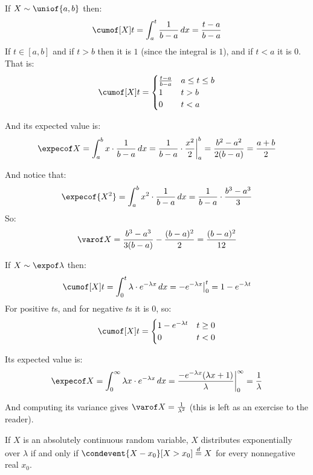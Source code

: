 \begin{exam}

	If $X\sim\uniof{a,b}$ then:
	\[ \cumof[X]t = \int_a^t \frac{1}{b-a}\,dx = \frac{t-a}{b-a} \]
	If $t\in[a,b]$ and if $t>b$ then it is $1$ (since the integral is $1$), and if $t<a$ it is $0$.
	That is:
	\[ \cumof[X]t = \begin{cases} \frac{t-a}{b-a} & a\leq t\leq b \\ 1 & t>b \\ 0 & t<a \end{cases} \]
	
	And its expected value is:
	\[ \expecof X = \int_a^b x\cdot\frac1{b-a}\,dx = \frac1{b-a}\cdot\frac{x^2}2\bigg|_a^b = \frac{b^2-a^2}{2(b-a)} = \frac{a+b}2 \]

	And notice that:
	\[ \expecof{X^2} = \int_a^b x^2\cdot\frac1{b-a}\,dx = \frac1{b-a}\cdot\frac{b^3-a^3}{3} \]
	So:
	\[ \varof X = \frac{b^3-a^3}{3(b-a)} - \frac{(b-a)^2}2 = \frac{(b-a)^2}{12} \]

\end{exam}

\begin{exam}

	If $X\sim\expof\lambda$ then:
	\[ \cumof[X]t = \int_0^t \lambda\cdot e^{-\lambda x}\,dx = -e^{-\lambda x}\big|_0^t = 1 - e^{-\lambda t} \]
	For positive $t$s, and for negative $t$s it is $0$, so:
	\[ \cumof[X]t = \begin{cases} 1 - e^{-\lambda t} & t\geq0 \\ 0 & t<0 \end{cases} \]

	Its expected value is:
	\[ \expecof X = \int_0^\infty \lambda x\cdot e^{-\lambda x}\,dx = \frac{-e^{-\lambda x}(\lambda x+1)}{\lambda}\bigg|_0^\infty = \frac1\lambda \]

	And computing its variance gives $\varof X=\frac1{\lambda^2}$ (this is left as an exercise to the reader).

\end{exam}

\begin{thrm*}

	If $X$ is an absolutely continuous random variable, $X$ distributes exponentially over $\lambda$ if and only if $\condevent{X-x_0}[X>x_0]\deq X$
	for every nonnegative real $x_0$.

\end{thrm*}

